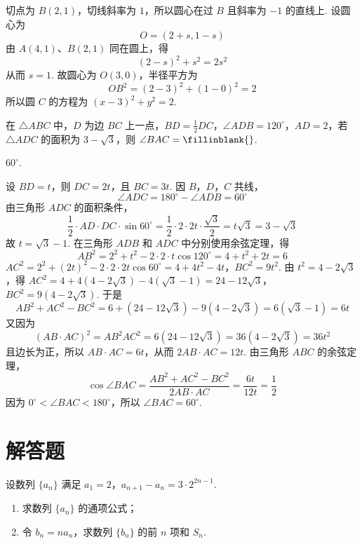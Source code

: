 \begin{solution}
切点为 \(B(2,1)\)，切线斜率为 \(1\)，所以圆心在过 \(B\) 且斜率为 \(-1\) 的直线上. 设圆心为
\[
O=(2+s,1-s)
\]
由 \(A(4,1)\)、\(B(2,1)\) 同在圆上，得
\[
(2-s)^2+s^2=2s^2
\]
从而 \(s=1\). 故圆心为 \(O(3,0)\)，半径平方为
\[
OB^2=(2-3)^2+(1-0)^2=2
\]
所以圆 \(C\) 的方程为 \((x-3)^2+y^2=2\).
\end{solution}

\begin{problem}
在 \(\triangle ABC\) 中，\(D\) 为边 \(BC\) 上一点，\(BD = \frac{1}{2} DC\)，\(\angle ADB = 120^{\circ}\)，\(AD = 2\)，若 \(\triangle ADC\) 的面积为 \(3 - \sqrt{3}\)，则 \(\angle BAC =\fillinblank{}\).
\end{problem}

\begin{answer}
\(60^\circ\).
\end{answer}

\begin{solution}
设 \(BD=t\)，则 \(DC=2t\)，且 \(BC=3t\). 因 \(B\)，\(D\)，\(C\) 共线，
\[
\angle ADC=180^\circ-\angle ADB=60^\circ
\]
由三角形 \(ADC\) 的面积条件，
\[
\frac12\cdot AD\cdot DC\cdot\sin60^\circ
=\frac12\cdot2\cdot2t\cdot\frac{\sqrt3}{2}
=t\sqrt3=3-\sqrt3
\]
故 \(t=\sqrt3-1\). 在三角形 \(ADB\) 和 \(ADC\) 中分别使用余弦定理，得
\[
AB^2=2^2+t^2-2\cdot2\cdot t\cos120^\circ=4+t^2+2t=6
\]
\(AC^2=2^2+(2t)^2-2\cdot2\cdot2t\cos60^\circ=4+4t^2-4t\)，\(BC^2=9t^2\).
由 \(t^2=4-2\sqrt3\)，得
\(AC^2=4+4(4-2\sqrt3)-4(\sqrt3-1)=24-12\sqrt3\)，\(BC^2=9(4-2\sqrt3)\).
于是
\[
AB^2+AC^2-BC^2
=6+(24-12\sqrt3)-9(4-2\sqrt3)
=6(\sqrt3-1)=6t
\]
又因为
\[
(AB\cdot AC)^2=AB^2AC^2=6(24-12\sqrt3)=36(4-2\sqrt3)=36t^2
\]
且边长为正，所以 \(AB\cdot AC=6t\)，从而 \(2AB\cdot AC=12t\).
由三角形 \(ABC\) 的余弦定理，
\[
\cos\angle BAC
=\frac{AB^2+AC^2-BC^2}{2AB\cdot AC}
=\frac{6t}{12t}=\frac12
\]
因为 \(0^\circ<\angle BAC<180^\circ\)，所以 \(\angle BAC=60^\circ\).
\end{solution}

\section{解答题}

\begin{problem}
设数列 \(\{a_{n}\}\) 满足 \(a_{1} = 2\)，\(a_{n+1} - a_{n} = 3 \cdot 2^{2n-1}\).

\begin{enumerate}
\item 求数列 \( \{a_{n}\} \) 的通项公式；
\item 令 \( b_{n} = na_{n} \)，求数列 \( \{b_{n}\} \) 的前 \( n \) 项和 \( S_{n} \).
\end{enumerate}
\end{problem}

